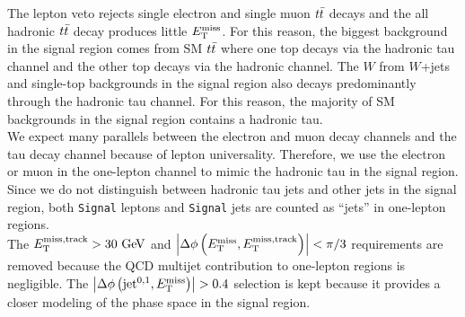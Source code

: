\indent The lepton veto rejects single electron and single muon $t\bar{t}$ decays and the all hadronic $t\bar{t}$ decay produces little $E_{\mathrm{T}}^{\mathrm{miss}}$.  For this reason, the biggest background in the signal region comes from SM $t\bar{t}$ where one top decays via the hadronic tau channel and the other top decays via the hadronic channel.  The $W$ from $W$+jets and single-top backgrounds in the signal region also decays predominantly through the hadronic tau channel.  For this reason, the majority of SM backgrounds in the signal region contains a hadronic tau.  \\

\indent We expect many parallels between the electron and muon decay channels and the tau decay channel because of lepton universality.  Therefore, we use the electron or muon in the one-lepton channel to mimic the hadronic tau in the signal region.  Since we do not distinguish between hadronic tau jets and other jets in the signal region, both {\tt Signal} leptons and {\tt Signal} jets are counted as ``jets'' in one-lepton regions. \\

\indent The $\mettrk > 30 \gev$ and $\dphimettrk < \pi/3$ requirements are removed because the QCD multijet contribution to one-lepton regions is negligible.  The $\left|\Delta\phi\left(\mathrm{jet}^{0,1},E_{\mathrm{T}}^{\mathrm{miss}}\right)\right| > 0.4$ selection is kept because it provides a closer modeling of the phase space in the signal region. \\


